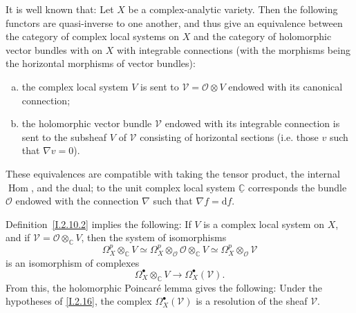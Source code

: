 \documentclass{report}
\theoremstyle{plain}
\newenvironment{proposition}[1]
    {\renewcommand\theinnercustomproposition{#1}\innercustomproposition}
    {\endinnercustomproposition}
\newenvironment{theorem}[1]
    {\renewcommand\theinnercustomtheorem{#1}\innercustomtheorem}
    {\endinnercustomlemma}
\theoremstyle{definition}
\newcommand{\sh}{\mathscr}
\newcommand{\CC}{\mathbb{C}}
\newcommand{\dd}{\mathrm{d}}
\DeclareMathOperator{\Hom}{Hom}
\newcommand{\oldpage}[1]{\marginpar{\footnotesize$\Big\vert$ \textit{p.~#1}}}
\begin{document}
It is well known that:
\begin{theorem}{2.17}
\label{I.2.17}
  Let $X$ be a complex-analytic variety.
  Then the following functors are quasi-inverse to one another, and thus give an equivalence between the category of complex local systems on $X$ and the category of holomorphic vector bundles with on $X$ with integrable connections (with the morphisms being the horizontal morphisms of vector bundles):
  \begin{enumerate}[a)]
    \item the complex local system $V$ is sent to $\sh{V}=\sh{O}\otimes V$ endowed with its canonical connection;
    \item the holomorphic vector bundle $\sh{V}$ endowed with its integrable connection is sent to the subsheaf $V$ of $\sh{V}$ consisting of horizontal sections (i.e. those $v$ such that $\nabla v=0$).
  \end{enumerate}
\end{theorem}

These equivalences are compatible with taking the tensor product, the internal $\Hom$, and the dual;
to the unit complex local system $\underline{\CC}$ corresponds the bundle $\sh{O}$ endowed with the connection $\nabla$ such that $\nabla f=\dd f$.

Definition~\cref{I.2.10.2} implies the following:
\begin{proposition}{2.18}
\label{I.2.18}
  If $V$ is a complex local system on $X$, and if $\sh{V}=\sh{O}\otimes_\CC V$,
\oldpage{13}
  then the system of isomorphisms
  \[
    \Omega_X^p\otimes_\CC V
    \simeq
    \Omega_X^p\otimes_\sh{O}\sh{O}\otimes_\CC V
    \simeq
    \Omega_X^p\otimes_\sh{O}\sh{V}
  \]
  is an isomorphism of complexes
  \[
    \Omega_X^\bullet\otimes_\CC V \to \Omega_X^\bullet(\sh{V}).
  \]
\end{proposition}
From this, the holomorphic Poincar\'{e} lemma gives the following:
\begin{proposition}{2.19}
\label{I.2.19}
  Under the hypotheses of \cref{I.2.16}, the complex $\Omega_X^\bullet(\sh{V})$ is a resolution of the sheaf $\sh{V}$.
\end{proposition}
\end{document}
